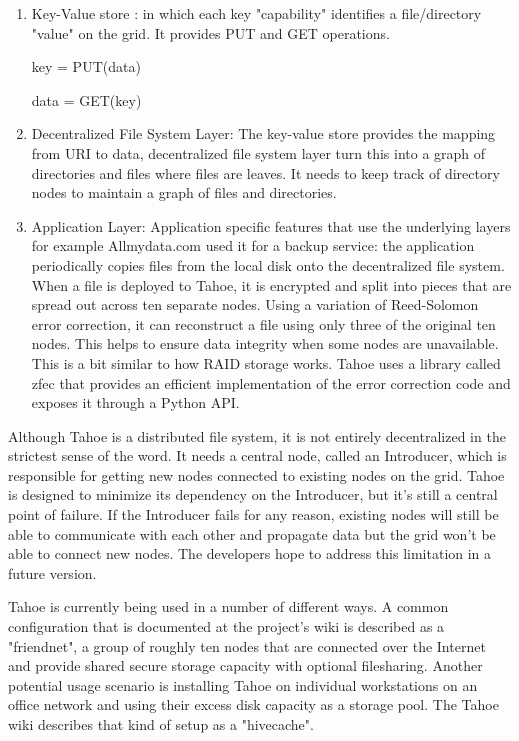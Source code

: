 \documentclass[11pt]{article}
\begin{document}
\begin{enumerate}
\item Key-Value store : in which each key "capability" identifies a 
file/directory "value" on the grid. It provides PUT and GET operations. 

\subitem key = PUT(data) 

\subitem data = GET(key)

\item Decentralized File System Layer:  The key-value store provides the 
mapping from URI to data, decentralized file system layer turn this into 
a graph of directories and files where files are leaves. It needs to keep 
track of directory nodes to maintain a graph of files and directories. 

\item Application Layer:  Application specific features that use the 
underlying layers for example Allmydata.com used it for a backup service: 
the application periodically copies files from the local disk onto the 
decentralized file system. When a file is deployed to Tahoe, it is 
encrypted and split into pieces that are spread out across ten separate 
nodes. Using a variation of Reed-Solomon error correction, it can 
reconstruct a file using only three of the original ten nodes. This helps 
to ensure data integrity when some nodes are unavailable. This is a bit 
similar to how RAID storage works. Tahoe uses a library called zfec that
provides an efficient implementation of the error correction code and 
exposes it through a Python API.

\end{enumerate}

Although Tahoe is a distributed file system, it is not entirely 
decentralized in the strictest sense of the word. It needs a central node, 
called an Introducer, which is responsible for getting new nodes connected 
to existing nodes on the grid. Tahoe is designed to minimize its dependency 
on the Introducer, but it's still a central point of failure. If the 
Introducer fails for any reason, existing nodes will still be able to 
communicate with each other and propagate data but the grid won't be able 
to connect new nodes. The developers hope to address this limitation in a 
future version.

Tahoe is currently being used in a number of different ways. A common 
configuration that is documented at the project's wiki is described as a 
"friendnet", a group of roughly ten nodes that are connected over the 
Internet and provide shared secure storage capacity with optional 
filesharing. Another potential usage scenario is installing Tahoe on 
individual workstations on an office network and using their excess disk 
capacity as a storage pool. The Tahoe wiki describes that kind of setup 
as a "hivecache".
\end{document}
